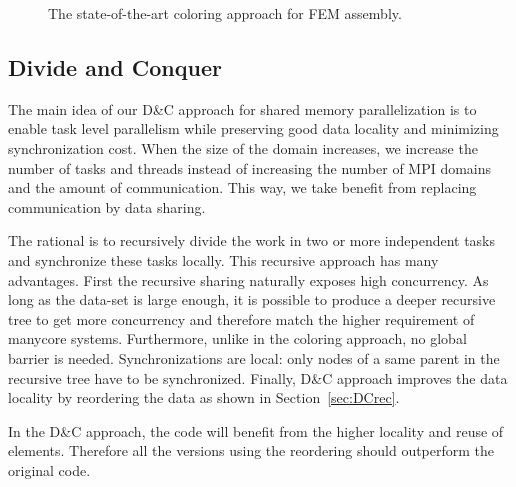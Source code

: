 \documentclass[10pt]{IOS-Book-Article}
\begin{document}
\begin{figure}[htp]
\caption{The state-of-the-art coloring approach for FEM assembly.}
\label{fig:colApp}
\end{figure}

\subsection{Divide and Conquer}
\label{sec:dc}

The main idea of our D\&C approach for shared memory parallelization is to enable task level parallelism while preserving good data locality and minimizing synchronization cost.
When the size of the domain increases, we increase the number of tasks and threads instead of increasing the number of MPI domains and the amount of communication.
This way, we take benefit from replacing communication by data sharing.

The rational is to recursively divide the work in two or more independent tasks and synchronize these tasks locally.
This recursive approach has many advantages.
First the recursive sharing naturally exposes high concurrency.
As long as the data-set is large enough, it is possible to produce a deeper recursive tree to get more concurrency and therefore match the higher requirement of manycore systems.
Furthermore, unlike in the coloring approach, no global barrier is needed.
Synchronizations are local: only nodes of a same parent in the recursive tree have to be synchronized.
Finally, D\&C approach improves the data locality by reordering the data as shown in Section~\ref{sec:DCrec}.

In the D\&C approach, the code will benefit from the higher locality and reuse of elements.
Therefore all the versions using the reordering should outperform the original code.
\end{document}
